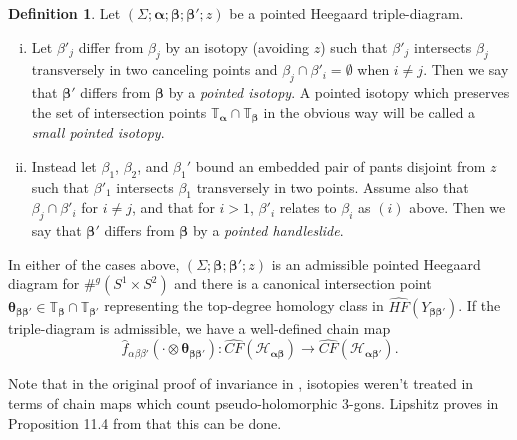 \documentclass[11pt]{article}
\theoremstyle{plain} \newtheorem{thm}{Theorem}[subsection]
\theoremstyle{plain} \newtheorem{cor}[thm]{Corollary}
\theoremstyle{plain} \newtheorem{prop}[thm]{Proposition}
\theoremstyle{plain} \newtheorem{conj}[thm]{Conjecture}
\theoremstyle{plain} \newtheorem{lem}[thm]{Lemma}
\theoremstyle{definition} \newtheorem{df}[thm]{Definition}
\theoremstyle{remark} \newtheorem{rmk}[thm]{Remark}
\theoremstyle{remark} \newtheorem{obs}[thm]{Observation}
\newcommand{\h}{\mathcal{H}}
\newcommand{\ba}{\boldsymbol{\alpha}}
\newcommand{\bb}{\boldsymbol{\beta}}
\newcommand{\Tb}{\mathbb{T}_{\bb}}
\newcommand{\Tbp}{\tor{\bb'}}
\newcommand{\Ybbp}{Y_{\bb\bb'}}
\newcommand{\thetabb}{\boldsymbol{\theta}_{\bb \bb'}}
\newcommand{\tor}[1]{\mathbb{T}_{#1}}
\begin{document}
\begin{df}\label{def:moves}
Let $\left(\Sigma; \ba; \bb; \bb'; z\right)$ be a pointed Heegaard triple-diagram.
\begin{enumerate}[(i)]
\item Let $\beta'_j$ differ from $\beta_j$ by an isotopy (avoiding $z$) such that $\beta'_j$ intersects $\beta_j$ transversely in two canceling points and $\beta_j \cap \beta'_i = \emptyset$ when $i \neq j.$  Then we say that $\bb'$ differs from $\bb$ by a \textit{pointed isotopy}.  A pointed isotopy which preserves the set of intersection points $\tor{\ba}\cap\tor{\bb}$ in the obvious way will be called a \textit{small pointed isotopy}.
\item Instead let $\beta_{1}$, $\beta_{2}$, and $\beta_{1}'$ bound an embedded pair of pants disjoint from $z$ such that $\beta'_{1}$ intersects $\beta_{1}$ transversely in two points.  Assume also that $\beta_j \cap \beta'_i$ for $i \neq j$, and that for $i > 1$, $\beta'_{i}$ relates to $\beta_i$ as $(i)$ above.  Then we say that $\bb'$ differs from $\bb$ by a \textit{pointed handleslide}.
\end{enumerate}
\end{df}

In either of the cases above, $\left( \Sigma; \bb; \bb'; z \right)$ is an admissible pointed Heegaard diagram for $\#^{g}(S^{1} \times S^{2})$ and there is a canonical intersection point $\thetabb \in \Tb \cap \Tbp$ representing the top-degree homology class in $\widehat{HF}(\Ybbp)$.  If the triple-diagram is admissible, we have a well-defined chain map 
\begin{equation*}
\widehat{f}_{\alpha\beta\beta'}(\cdot \otimes \thetabb):
\widehat{CF}(\h_{\ba\bb}) \rightarrow \widehat{CF}(\h_{\ba\bb'}).
\end{equation*}

Note that in the original proof of invariance in \cite{os:disk}, isotopies weren't treated in terms of chain maps which count pseudo-holomorphic 3-gons.  Lipshitz proves in Proposition 11.4 from  \cite{lip:cyl} that this can be done.
\end{document}
